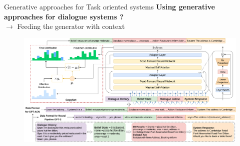\documentclass[10pt,aspectratio=169]{beamer}
\begin{document}
\begin{frame}{Generative approaches for Task oriented systems}
    \textbf{Using generative approaches for dialogue systems ?}\\
    $\rightarrow$ Feeding the generator with context 

    \begin{figure}
        \includegraphics[width=1.\textwidth]{media/fully_generative.png}
    \end{figure}
\end{frame}



\end{document}
